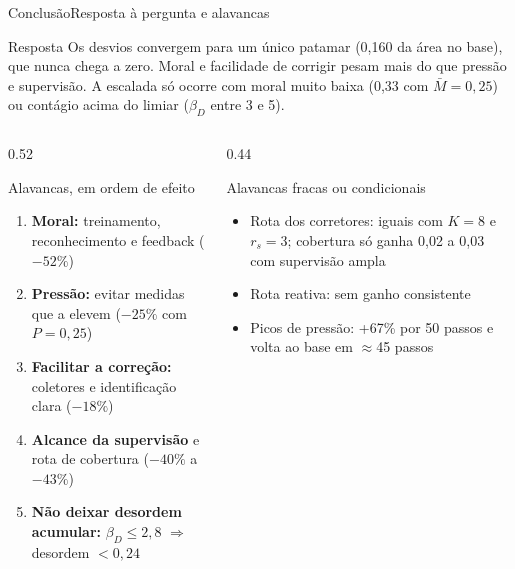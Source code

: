 \documentclass[aspectratio=169, 10pt]{beamer}
\begin{document}
\begin{frame}{Conclusão}{Resposta à pergunta e alavancas}
  \begin{block}{Resposta}
    \small Os desvios convergem para um único patamar (0,160 da área no base), que nunca chega a zero. Moral e facilidade de corrigir pesam mais do que pressão e supervisão. A escalada só ocorre com moral muito baixa (0,33 com $\bar M=0{,}25$) ou contágio acima do limiar ($\beta_D$ entre 3 e 5).
  \end{block}
  \begin{columns}[T]
    \begin{column}{0.52\textwidth}
      \begin{exampleblock}{Alavancas, em ordem de efeito}
        \footnotesize
        \begin{enumerate}
          \item \textbf{Moral:} treinamento, reconhecimento e feedback ($-52\%$)
          \item \textbf{Pressão:} evitar medidas que a elevem ($-25\%$ com $P=0{,}25$)
          \item \textbf{Facilitar a correção:} coletores e identificação clara ($-18\%$)
          \item \textbf{Alcance da supervisão} e rota de cobertura ($-40\%$ a $-43\%$)
          \item \textbf{Não deixar desordem acumular:} $\beta_D\le2{,}8$ $\Rightarrow$ desordem $<0{,}24$
        \end{enumerate}
      \end{exampleblock}
    \end{column}
    \begin{column}{0.44\textwidth}
      \begin{alertblock}{Alavancas fracas ou condicionais}
        \footnotesize
        \begin{itemize}
          \item Rota dos corretores: iguais com $K=8$ e $r_s=3$; cobertura só ganha 0,02 a 0,03 com supervisão ampla
          \item Rota reativa: sem ganho consistente
          \item Picos de pressão: +67\% por 50 passos e volta ao base em $\approx$45 passos
        \end{itemize}
      \end{alertblock}
    \end{column}
  \end{columns}
\end{frame}
\end{document}
